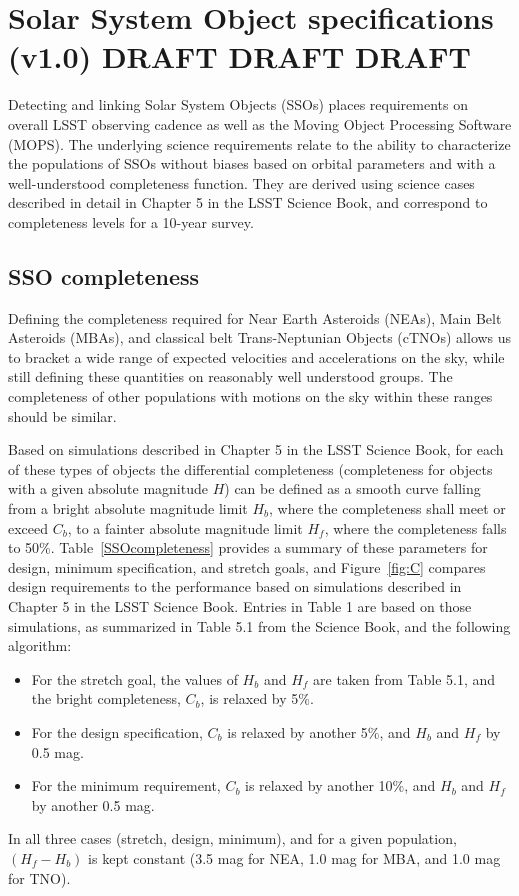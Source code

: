 \documentclass[manuscript]{aastex}
\begin{document}
\section{Solar System Object specifications (v1.0) DRAFT DRAFT DRAFT}

Detecting and linking Solar System Objects (SSOs) places requirements on overall LSST observing cadence as well 
as the Moving Object Processing Software (MOPS). The underlying science requirements relate to the ability to 
characterize the populations of  SSOs without biases based on orbital parameters and with a well-understood 
completeness function. They are derived using science cases described in detail in Chapter 5 in the LSST Science 
Book, and correspond to completeness levels for a 10-year survey. 

\subsection{SSO completeness}

Defining the completeness required for Near Earth Asteroids (NEAs), Main Belt Asteroids (MBAs), and classical belt Trans-Neptunian Objects (cTNOs) allows us to bracket a wide range of expected velocities and accelerations on the sky, while still defining these quantities on reasonably well understood groups. The completeness of other populations with motions on the sky within these ranges should be similar. 

Based on simulations described in Chapter 5 in the LSST Science Book, for each of these types of objects the 
differential completeness (completeness for objects with a given absolute magnitude $H$) 
can be defined as a smooth curve falling from a bright absolute magnitude limit $H_b$, where the completeness shall meet or exceed $C_b$, to a fainter absolute magnitude limit $H_f$,  where the completeness falls to 50\%. Table~\ref{SSOcompleteness} provides a summary of these parameters for design, minimum specification, and stretch goals, and Figure~\ref{fig:C} compares design requirements
to the performance based on simulations described in Chapter 5 in the LSST Science Book. 
Entries in Table 1 are based on those simulations, as summarized in Table 5.1 from the Science Book, 
and the following algorithm:
\begin{itemize}
\item For the stretch goal, the values of $H_b$ and $H_f$ are taken from Table 5.1, and the bright completeness, 
$C_b$, is relaxed by 5\%.
\item For the design specification, $C_b$ is relaxed by another 5\%, and $H_b$ and $H_f$ by 0.5 mag. 
\item For the minimum requirement, $C_b$ is relaxed by another 10\%, and $H_b$ and $H_f$ by another 0.5 mag. 
\end{itemize}
In all three cases (stretch, design, minimum), and for a given population, $(H_f-H_b)$ is kept constant 
(3.5 mag for NEA, 1.0 mag for MBA, and 1.0 mag for TNO). 
\end{document}
